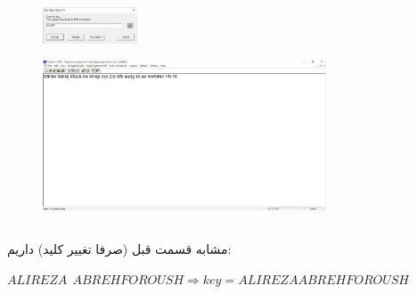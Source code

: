 \documentclass{article}
\begin{document}
\begin{figure}[H]
    \centering
    \includegraphics[width=0.25\textwidth]{figures/3ab.jpg}
    \caption
	{}
    \label{fig:fig1}
\end{figure}

\begin{figure}[H]
    \centering
    \includegraphics[width=0.75\textwidth]{figures/3ac.jpg}
    \caption
	{}
    \label{fig:fig1}
\end{figure}

\subsection{}
مشابه قسمت قبل (صرفا تغییر کلید) داریم:
\begin{latin}
$
ALIREZA\:\:ABREHFOROUSH \Rightarrow key = ALIREZAABREHFOROUSH
$
\end{latin}
\end{document}
